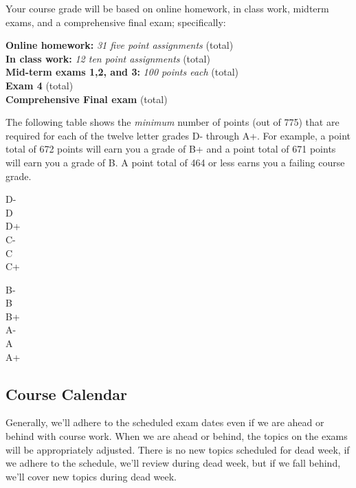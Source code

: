 \documentclass[12pt]{article}
\newcounter{ex}\setcounter{ex}{0}
\newenvironment{mypar}[2]
  {\begin{list}{}%
    {\setlength\leftmargin{#1}
    \setlength\rightmargin{#2}}
    \item[]}
  {\end{list}}
\begin{document}
Your course grade will be based on online homework, in class work, midterm exams, and a comprehensive 
final exam; specifically:
\begin{mypar}{0.25in}{0.25in}
    \textbf{Online homework:} \emph{31 five point assignments}  (total)\\
    \textbf{In class work:}  \emph{12 ten point assignments}   (total) \\
    \textbf{Mid-term exams 1,2, and 3:} \emph{100 points each}  (total)\\
    \textbf{Exam 4}  (total)\\
    \textbf{Comprehensive Final exam}  (total)\\
\end{mypar}
\noindent The following table shows the \emph{minimum} number of points (out of 775) that
are required for each of the twelve letter grades D- through A+. For
example, a point total of 672 points will earn you a grade of B+ and 
a point total of 671 points will earn you a grade of B. A point
total of 464 or less earns you a failing course grade.

\begin{mypar}{0.25in}{0.25in}
    \begin{minipage}{2.5in}
        D-    \\
        D  \\
        D+  \\
        C-  \\
        C  \\
        C+  
    \end{minipage}
    \phantom{xxx}
    \begin{minipage}{2.5in}
        B-  \\
        B  \\
        B+  \\
        A-  \\
        A  \\
        A+  
    \end{minipage}
\end{mypar} 

\subsection*{Course Calendar}

Generally, we'll adhere to the scheduled exam dates even if we are ahead or behind with course work.  When we are ahead or behind, the
topics on the exams will be appropriately adjusted.  There is no new topics scheduled for dead week, if we adhere to the schedule, we'll review during dead week, but
if we fall behind, we'll cover new topics during dead week.
\end{document}
